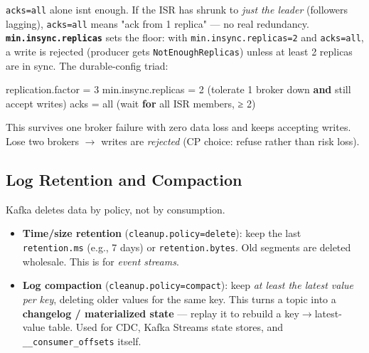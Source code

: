 \documentclass[11pt]{article}
\providecommand{\tightlist}{\setlength{\itemsep}{1pt}\setlength{\parskip}{0pt}}
\newenvironment{Shaded}{\begin{snugshade}}{\end{snugshade}}
\newcommand{\BuiltInTok}[1]{\textcolor[rgb]{0.50,0.55,0.55}{#1}}
\newcommand{\ControlFlowTok}[1]{\textcolor[rgb]{0.99,0.74,0.29}{\textbf{#1}}}
\newcommand{\DecValTok}[1]{\textcolor[rgb]{0.96,0.45,0.00}{#1}}
\newcommand{\KeywordTok}[1]{\textcolor[rgb]{0.81,0.81,0.76}{\textbf{#1}}}
\newcommand{\NormalTok}[1]{\textcolor[rgb]{0.81,0.81,0.76}{#1}}
\newcommand{\OperatorTok}[1]{\textcolor[rgb]{0.81,0.81,0.76}{#1}}
\begin{document}
\texttt{acks=all} alone isn\textquotesingle t enough. If the ISR has shrunk to \emph{just the leader} (followers lagging), \texttt{acks=all} means "ack from 1 replica" --- no real redundancy. \textbf{\texttt{min.insync.replicas}} sets the floor: with \texttt{min.insync.replicas=2} and \texttt{acks=all}, a write is rejected (producer gets \texttt{NotEnoughReplicas}) unless at least 2 replicas are in sync. The durable-config triad:


\begin{Shaded}
\begin{Highlighting}[]
\NormalTok{replication.factor }\OperatorTok{=} \DecValTok{3}
\BuiltInTok{min}\NormalTok{.insync.replicas }\OperatorTok{=} \DecValTok{2}\NormalTok{     (tolerate }\DecValTok{1}\NormalTok{ broker down }\KeywordTok{and}\NormalTok{ still accept writes)}
\NormalTok{acks }\OperatorTok{=} \BuiltInTok{all}\NormalTok{                  (wait }\ControlFlowTok{for} \BuiltInTok{all}\NormalTok{ ISR members, ≥ }\DecValTok{2}\NormalTok{)}
\end{Highlighting}
\end{Shaded}

This survives one broker failure with zero data loss and keeps accepting writes. Lose two brokers \(\rightarrow\) writes are \emph{rejected} (CP choice: refuse rather than risk loss).

\subsection{Log Retention and Compaction}\label{log-retention-and-compaction}

Kafka deletes data by policy, not by consumption.

\begin{itemize}
\tightlist
\item
  \textbf{Time/size retention} (\texttt{cleanup.policy=delete}): keep the last \texttt{retention.ms} (e.g., 7 days) or \texttt{retention.bytes}. Old segments are deleted wholesale. This is for \emph{event streams}.
\item
  \textbf{Log compaction} (\texttt{cleanup.policy=compact}): keep \emph{at least the latest value per key}, deleting older values for the same key. This turns a topic into a \textbf{changelog / materialized state} --- replay it to rebuild a key\(\rightarrow\)latest-value table. Used for CDC, Kafka Streams state stores, and \texttt{\_\_consumer\_offsets} itself.
\end{itemize}
\end{document}

